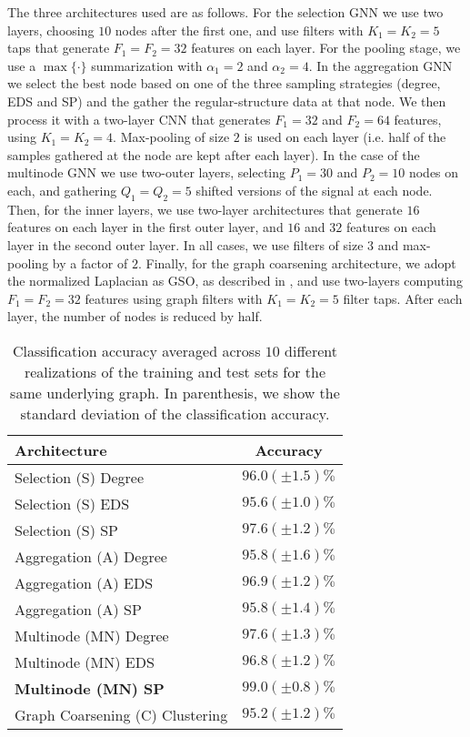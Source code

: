 The three architectures used are as follows. For the selection GNN we use two layers, choosing $10$ nodes after the first one, and use filters with $K_{1}=K_{2}=5$ taps that generate $F_{1}=F_{2}=32$ features on each layer. For the pooling stage, we use a $\max\{\cdot\}$ summarization with $\alpha_{1}=2$ and $\alpha_{2}=4$. In the aggregation GNN we select the best node based on one of the three sampling strategies (degree, EDS and SP) and the gather the regular-structure data at that node. We then process it with a two-layer CNN that generates $F_{1}=32$ and $F_{2}=64$ features, using $K_{1}=K_{2}=4$. Max-pooling of size $2$ is used on each layer (i.e. half of the samples gathered at the node are kept after each layer). In the case of the multinode GNN we use two-outer layers, selecting $P_{1}=30$ and $P_{2}=10$ nodes on each, and gathering $Q_{1}=Q_{2}=5$ shifted versions of the signal at each node. Then, for the inner layers, we use two-layer architectures that generate $16$ features on each layer in the first outer layer, and $16$ and $32$ features on each layer in the second outer layer. In all cases, we use filters of size $3$ and max-pooling by a factor of $2$. Finally, for the graph coarsening architecture, we adopt the normalized Laplacian as GSO, as described in \cite{defferrard17-cnngraphs}, and use two-layers computing $F_{1}=F_{2}=32$ features using graph filters with $K_{1}=K_{2}=5$ filter taps. After each layer, the number of nodes is reduced by half.

\begin{table}
	\centering
\begin{tabular}{lc} \hline
Architecture 				& Accuracy 				\\ \hline
Selection (S) Degree		& $96.0 (\pm 1.5) \%$	\\
Selection (S) EDS			& $95.6 (\pm 1.0) \%$	\\
Selection (S) SP			& $97.6 (\pm 1.2) \%$	\\
Aggregation	(A)	Degree		& $95.8 (\pm 1.6) \%$	\\
Aggregation	(A)	EDS			& $96.9 (\pm 1.2) \%$	\\
Aggregation	(A)	SP			& $95.8 (\pm 1.4) \%$	\\
Multinode (MN) Degree		& $97.6 (\pm 1.3) \%$	\\
Multinode (MN) EDS			& $96.8 (\pm 1.2) \%$	\\
\textbf{Multinode (MN) SP}			& $\mathbf{99.0 (\pm 0.8) \%}$	\\
Graph Coarsening (C) Clustering		& $95.2 (\pm 1.2)\%$ \\ \hline
\end{tabular}
	\caption{Classification accuracy averaged across $10$ different realizations of the training and test sets for the same underlying graph. In parenthesis, we show the standard deviation of the classification accuracy.}
	\label{table_fb}
\end{table}

